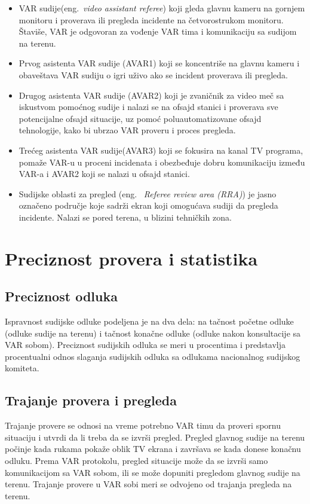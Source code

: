 \documentclass[a4paper]{article}
\begin{document}
\begin{itemize}

\item VAR sudije(eng.~{\em video assistant referee}) koji gleda glavnu kameru na gornjem monitoru i proverava ili pregleda incidente na četvorostrukom monitoru. Štaviše, VAR je odgovoran za vođenje VAR tima i komunikaciju sa sudijom na terenu.
\item Prvog asistenta VAR sudije (AVAR1) koji se koncentriše na glavnu kameru i obaveštava VAR sudiju o igri uživo ako se incident proverava ili pregleda.
\item Drugog asistenta VAR sudije (AVAR2) koji je zvaničnik za video meč sa iskustvom pomoćnog sudije i nalazi se na ofsajd stanici i proverava sve potencijalne ofsajd situacije, uz pomoć poluautomatizovane ofsajd tehnologije, kako bi ubrzao VAR proveru i proces pregleda.
\item Trećeg asistenta VAR sudije(AVAR3) koji se fokusira na kanal TV programa, pomaže VAR-u u proceni incidenata i obezbeđuje dobru komunikaciju između VAR-a i AVAR2 koji se nalazi u ofsajd stanici.
\item Sudijske oblasti za pregled (eng. ~{\em Referee review area (RRA)}) je jasno označeno područje koje sadrži ekran koji omogućava sudiji da pregleda incidente. Nalazi se pored terena, u blizini tehničkih zona.
\end{itemize}

\section{Preciznost provera i statistika} 
\subsection{Preciznost odluka} 
Ispravnost sudijske odluke podeljena je na dva dela: na tačnost početne odluke (odluke sudije na terenu) i tačnost konačne odluke (odluke nakon konsultacije sa VAR sobom). Preciznost sudijskih odluka se meri u procentima i predstavlja procentualni odnos slaganja sudijskih odluka sa odlukama nacionalnog sudijskog komiteta. 

\subsection{Trajanje provera i pregleda} 
Trajanje provere se odnosi na vreme potrebno VAR timu da proveri spornu situaciju i utvrdi da li treba da se izvrši pregled. Pregled glavnog sudije na terenu počinje kada rukama pokaže oblik TV ekrana i završava se kada donese konačnu odluku. Prema VAR protokolu, pregled situacije može da se izvrši samo komunikacijom sa VAR sobom, ili se može dopuniti pregledom glavnog sudije na terenu. Trajanje provere u VAR sobi meri se odvojeno od trajanja pregleda na terenu.
\end{document}
